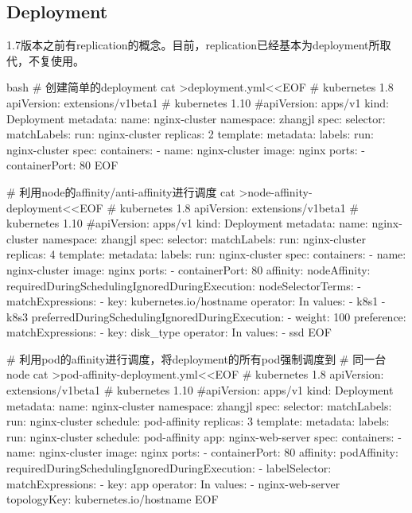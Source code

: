 \subsection{Deployment}
1.7版本之前有replication的概念。目前，replication已经基本为deployment所取代，不复使用。
\begin{code-block}{bash}
# 创建简单的deployment
cat >deployment.yml<<EOF
# kubernetes 1.8
apiVersion: extensions/v1beta1
# kubernetes 1.10
#apiVersion: apps/v1
kind: Deployment
metadata:
  name: nginx-cluster
  namespace: zhangjl
spec:
  selector:
    matchLabels:
      run: nginx-cluster
  replicas: 2
  template:
    metadata:
      labels:
        run: nginx-cluster
    spec:
      containers:
      - name: nginx-cluster
        image: nginx
        ports:
        - containerPort: 80
EOF

# 利用node的affinity/anti-affinity进行调度
cat >node-affinity-deployment<<EOF
# kubernetes 1.8
apiVersion: extensions/v1beta1
# kubernetes 1.10
#apiVersion: apps/v1
kind: Deployment
metadata:
  name: nginx-cluster
  namespace: zhangjl
spec:
  selector:
    matchLabels:
      run: nginx-cluster
  replicas: 4
  template:
    metadata:
      labels:
        run: nginx-cluster
    spec:
      containers:
      - name: nginx-cluster
        image: nginx
        ports:
        - containerPort: 80
      affinity:
        nodeAffinity:
          requiredDuringSchedulingIgnoredDuringExecution:
            nodeSelectorTerms:
            - matchExpressions:
              - key: kubernetes.io/hostname
                operator: In
                values:
                - k8s1
                - k8s3
          preferredDuringSchedulingIgnoredDuringExecution:
          - weight: 100
            preference:
              matchExpressions:
              - key: disk_type
                operator: In
                values:
                - ssd
EOF

# 利用pod的affinity进行调度，将deployment的所有pod强制调度到
# 同一台node
cat >pod-affinity-deployment.yml<<EOF
# kubernetes 1.8
apiVersion: extensions/v1beta1
# kubernetes 1.10
#apiVersion: apps/v1
kind: Deployment
metadata:
  name: nginx-cluster
  namespace: zhangjl
spec:
  selector:
    matchLabels:
      run: nginx-cluster
      schedule: pod-affinity
  replicas: 3
  template:
    metadata:
      labels:
        run: nginx-cluster
        schedule: pod-affinity
        app: nginx-web-server
    spec:
      containers:
      - name: nginx-cluster
        image: nginx
        ports:
        - containerPort: 80
      affinity:
        podAffinity:
          requiredDuringSchedulingIgnoredDuringExecution:
          - labelSelector:
              matchExpressions:
              - key: app
                operator: In
                values:
                - nginx-web-server
            topologyKey: kubernetes.io/hostname
EOF


\end{code-block}
